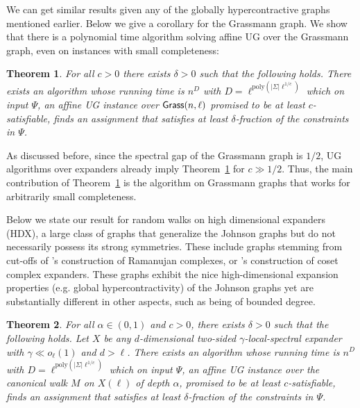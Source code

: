 \documentclass[11pt]{article}
\def \poly {\mathrm{poly}}
\newtheorem{theorem}{Theorem}[section]
\theoremstyle{definition}
\begin{document}
We can get similar results given any of the globally hypercontractive graphs mentioned earlier. Below
we give a corollary for the Grassmann graph.
We show that there is a polynomial time algorithm solving affine UG over the Grassmann graph, even on 
instances with small completeness:
\begin{theorem}\label{thm:main_grass}
For all $c>0$ there exists $\delta>0$ such that the following holds. There exists an algorithm whose running time is $n^{D}$ with $D = \ell^{\poly(|\Sigma|\ell^{1/c})}$ which
on input $\Psi$, an affine UG instance over 
${\sf Grass}(n,\ell)$ promised to be at least $c$-satisfiable, finds an assignment that satisfies 
at least $\delta$-fraction of the constraints in $\Psi$.
\end{theorem}

As discussed before, since the spectral gap of the Grassmann graph is $1/2$, UG algorithms over expanders already imply Theorem~\ref{thm:main_grass} for $c \gg 1/2$. Thus, the main contribution of Theorem~\ref{thm:main_grass} is the algorithm on Grassmann graphs that works for arbitrarily small completeness.

Below we state our result for random walks on high dimensional expanders (HDX), a large class of graphs that generalize the Johnson graphs but do not necessarily possess its strong symmetries. These  include graphs stemming from cut-offs of \cite{lubotzky2005explicit}'s construction of Ramanujan complexes, or  \cite{kaufman2018construction}'s construction of coset complex expanders. These graphs exhibit the nice high-dimensional expansion properties (e.g. global hypercontractivity) of the Johnson graphs yet are substantially different in other aspects, such as being of bounded degree.

\begin{theorem}\label{thm:main_hdx}
For all $\alpha \in (0,1)$ and $c>0$, there exists $\delta > 0$ such that the following holds. Let $X$ be any $d$-dimensional two-sided $\gamma$-local-spectral expander with $\gamma \ll o_\ell(1)$ and $d>\ell$. There exists an algorithm whose running time is $n^{D}$ with $D = \ell^{\poly(|\Sigma|\ell^{1/c})}$ which on input $\Psi$, an affine UG instance over the canonical walk $M$ on $X(\ell)$ of depth $\alpha$, promised to be at least $c$-satisfiable, finds an assignment that satisfies 
at least $\delta$-fraction of the constraints in $\Psi$.
\end{theorem}
\end{document}
